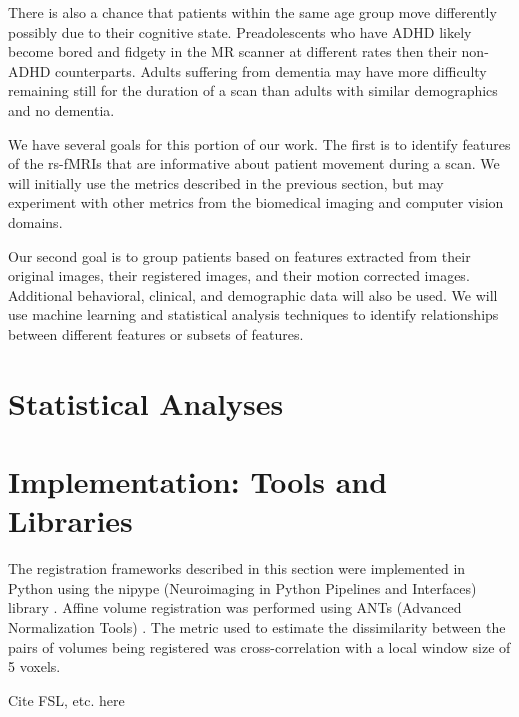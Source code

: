 There is also a chance that patients within the same age group move differently possibly due to their cognitive state. Preadolescents who have ADHD likely become bored and fidgety in the MR scanner at different rates then their non-ADHD counterparts. Adults suffering from dementia may have more difficulty remaining still for the duration of a scan than adults with similar demographics and no dementia.

We have several goals for this portion of our work. The first is to identify features of the rs-fMRIs that are informative about patient movement during a scan. We will initially use the metrics described in the previous section, but may experiment with other metrics from the biomedical imaging and computer vision domains.

Our second goal is to group patients based on features extracted from their original images, their registered images, and their motion corrected images. Additional behavioral, clinical, and demographic data will also be used. We will use machine learning and statistical analysis techniques to identify relationships between different features or subsets of features. 


\section{Statistical Analyses}

\section{Implementation: Tools and Libraries}

The registration frameworks described in this section were implemented in Python using the nipype (Neuroimaging in Python Pipelines and Interfaces) library \cite{Gorgolewski2011}. Affine volume registration was performed using ANTs (Advanced Normalization Tools) \cite{Avants2014}. The metric used to estimate the dissimilarity between the pairs of volumes being registered was cross-correlation with a local window size of 5 voxels. 

Cite FSL, etc. here

